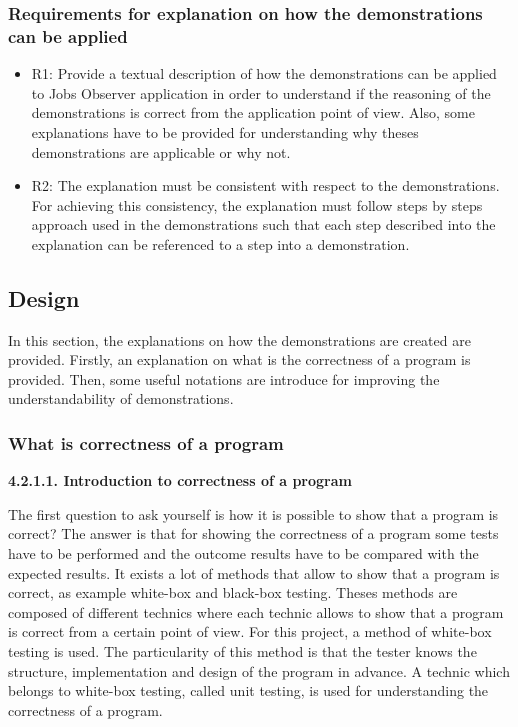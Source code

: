 \documentclass[conference,compsoc]{IEEEtran}
\begin{document}
\subsubsection{Requirements for explanation on how the demonstrations can be applied}
\begin{itemize}
	\item R1:  Provide a textual description of how the demonstrations can be applied to Jobs Observer application in order to understand if the reasoning of the demonstrations is correct from the application point of view. Also, some explanations have to be provided for understanding why theses demonstrations are applicable or why not. 
	\newline
	\item R2:  The explanation must be consistent with respect to the demonstrations. For achieving this consistency, the explanation must follow steps by steps approach used in the demonstrations such that each step described into the explanation can be referenced to a step into a demonstration. 
	
\end{itemize}
\subsection{Design}
In this section, the explanations on how the demonstrations are created are provided. Firstly, an explanation on what is the correctness of a program is provided. Then, some useful notations are introduce for improving the understandability of demonstrations. 

\subsubsection{What is correctness of a program}
\noindent
\newline\newline  
\textbf{4.2.1.1. Introduction to correctness of a program}
\newline

The first question to ask yourself is how it is possible to show that a program is correct? The answer is that for showing the correctness of a program some tests have to be performed and the outcome results have to be compared with the expected results. 
\newline
It exists a lot of methods that allow to show that a program is correct, as example white-box and black-box testing. Theses methods are composed of different technics where each technic allows to show that a program is correct from a certain point of view. For this project, a method of white-box testing is used. 
\newline
The particularity of this method is that the tester knows the structure, implementation and design of the program in advance. A technic which belongs to white-box testing, called unit testing, is used for understanding the correctness of a program.          
\end{document}
